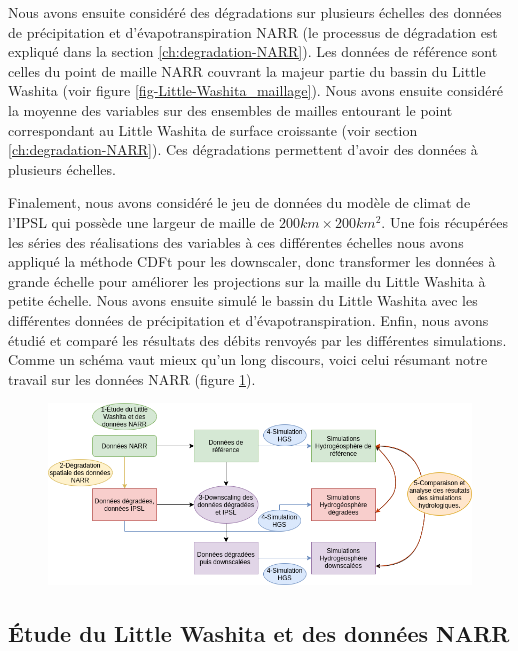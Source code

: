 \documentclass[a4paper,11pt]{article}
\numberwithin{equation}{section}
\begin{document}
Nous avons ensuite considéré des dégradations sur plusieurs échelles des données de précipitation et d'évapotranspiration NARR (le processus de dégradation est expliqué dans la section \ref{ch:degradation-NARR}). Les données de référence sont celles du point de maille NARR couvrant la majeur partie du bassin du Little Washita (voir figure \ref{fig-Little-Washita_maillage}). Nous avons ensuite considéré la moyenne des variables sur des ensembles de mailles entourant le point correspondant au Little Washita de surface croissante (voir section \ref{ch:degradation-NARR}). Ces dégradations permettent d'avoir des données à plusieurs échelles.

Finalement, nous avons considéré le jeu de données du modèle de climat de l'IPSL qui possède une largeur de maille de $200km\times 200km^2$. Une fois récupérées les séries des réalisations des variables à ces différentes échelles nous avons appliqué la méthode CDFt pour les downscaler, donc transformer les données à grande échelle pour améliorer les projections sur la maille du Little Washita à petite échelle. Nous avons ensuite simulé le bassin du Little Washita avec les différentes données de précipitation et d'évapotranspiration. Enfin, nous avons étudié et comparé les résultats des débits renvoyés par les différentes simulations. Comme un schéma vaut mieux qu'un long discours, voici celui résumant notre travail sur les données NARR (figure \ref{fig-methodo}).

\begin{figure}[H]
	\begin{center}
		\includegraphics[scale=0.6]{Diagrame_methodo.png}
	\end{center}
	\label{fig-methodo}
\end{figure}

\subsection{Étude du Little Washita et des données NARR}
\end{document}
